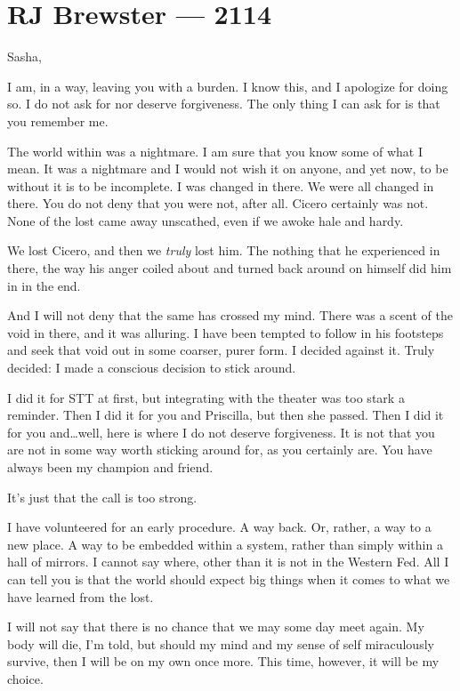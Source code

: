 \hypertarget{rj-brewster-2114}{%
\chapter*{RJ Brewster — 2114}\label{rj-brewster-2114}}

Sasha,

I am, in a way, leaving you with a burden. I know this, and I apologize for doing so. I do not ask for nor deserve forgiveness. The only thing I can ask for is that you remember me.

The world within was a nightmare. I am sure that you know some of what I mean. It was a nightmare and I would not wish it on anyone, and yet now, to be without it is to be incomplete. I was changed in there. We were all changed in there. You do not deny that you were not, after all. Cicero certainly was not. None of the lost came away unscathed, even if we awoke hale and hardy.

We lost Cicero, and then we \emph{truly} lost him. The nothing that he experienced in there, the way his anger coiled about and turned back around on himself did him in in the end.

And I will not deny that the same has crossed my mind. There was a scent of the void in there, and it was alluring. I have been tempted to follow in his footsteps and seek that void out in some coarser, purer form. I decided against it. Truly decided: I made a conscious decision to stick around.

I did it for STT at first, but integrating with the theater was too stark a reminder. Then I did it for you and Priscilla, but then she passed. Then I did it for you and\ldots{}well, here is where I do not deserve forgiveness. It is not that you are not in some way worth sticking around for, as you certainly are. You have always been my champion and friend.

It's just that the call is too strong.

I have volunteered for an early procedure. A way back. Or, rather, a way to a new place. A way to be embedded within a system, rather than simply within a hall of mirrors. I cannot say where, other than it is not in the Western Fed. All I can tell you is that the world should expect big things when it comes to what we have learned from the lost.

I will not say that there is no chance that we may some day meet again. My body will die, I'm told, but should my mind and my sense of self miraculously survive, then I will be on my own once more. This time, however, it will be my choice.

